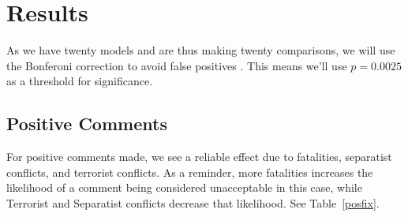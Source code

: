 \section{Results}
As we have twenty models and are thus making twenty comparisons, we will use the Bonferoni correction to avoid false positives \cite{bonferoni}. This means we'll use $p=0.0025$ as a threshold for significance.

\subsection{Positive Comments}
For positive comments made, we see a reliable effect due to fatalities, separatist conflicts, and terrorist conflicts. As a reminder, more fatalities increases the likelihood of a comment being considered unacceptable in this case, while Terrorist and Separatist conflicts decrease that likelihood. See Table~\ref{posfix}.

